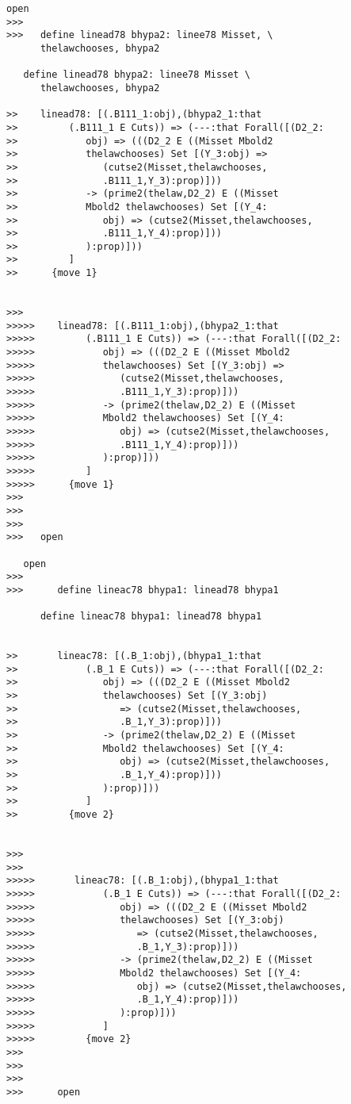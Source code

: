 \documentclass[12pt]{article}
\begin{document}
\begin{verbatim}
open
>>>
>>>   define linead78 bhypa2: linee78 Misset, \
      thelawchooses, bhypa2

   define linead78 bhypa2: linee78 Misset \
      thelawchooses, bhypa2

>>    linead78: [(.B111_1:obj),(bhypa2_1:that
>>         (.B111_1 E Cuts)) => (---:that Forall([(D2_2:
>>            obj) => (((D2_2 E ((Misset Mbold2
>>            thelawchooses) Set [(Y_3:obj) =>
>>               (cutse2(Misset,thelawchooses,
>>               .B111_1,Y_3):prop)]))
>>            -> (prime2(thelaw,D2_2) E ((Misset
>>            Mbold2 thelawchooses) Set [(Y_4:
>>               obj) => (cutse2(Misset,thelawchooses,
>>               .B111_1,Y_4):prop)]))
>>            ):prop)]))
>>         ]
>>      {move 1}


>>>
>>>>>    linead78: [(.B111_1:obj),(bhypa2_1:that
>>>>>         (.B111_1 E Cuts)) => (---:that Forall([(D2_2:
>>>>>            obj) => (((D2_2 E ((Misset Mbold2
>>>>>            thelawchooses) Set [(Y_3:obj) =>
>>>>>               (cutse2(Misset,thelawchooses,
>>>>>               .B111_1,Y_3):prop)]))
>>>>>            -> (prime2(thelaw,D2_2) E ((Misset
>>>>>            Mbold2 thelawchooses) Set [(Y_4:
>>>>>               obj) => (cutse2(Misset,thelawchooses,
>>>>>               .B111_1,Y_4):prop)]))
>>>>>            ):prop)]))
>>>>>         ]
>>>>>      {move 1}
>>>
>>>
>>>
>>>   open

   open
>>>
>>>      define lineac78 bhypa1: linead78 bhypa1

      define lineac78 bhypa1: linead78 bhypa1


>>       lineac78: [(.B_1:obj),(bhypa1_1:that
>>            (.B_1 E Cuts)) => (---:that Forall([(D2_2:
>>               obj) => (((D2_2 E ((Misset Mbold2
>>               thelawchooses) Set [(Y_3:obj)
>>                  => (cutse2(Misset,thelawchooses,
>>                  .B_1,Y_3):prop)]))
>>               -> (prime2(thelaw,D2_2) E ((Misset
>>               Mbold2 thelawchooses) Set [(Y_4:
>>                  obj) => (cutse2(Misset,thelawchooses,
>>                  .B_1,Y_4):prop)]))
>>               ):prop)]))
>>            ]
>>         {move 2}


>>>
>>>
>>>>>       lineac78: [(.B_1:obj),(bhypa1_1:that
>>>>>            (.B_1 E Cuts)) => (---:that Forall([(D2_2:
>>>>>               obj) => (((D2_2 E ((Misset Mbold2
>>>>>               thelawchooses) Set [(Y_3:obj)
>>>>>                  => (cutse2(Misset,thelawchooses,
>>>>>                  .B_1,Y_3):prop)]))
>>>>>               -> (prime2(thelaw,D2_2) E ((Misset
>>>>>               Mbold2 thelawchooses) Set [(Y_4:
>>>>>                  obj) => (cutse2(Misset,thelawchooses,
>>>>>                  .B_1,Y_4):prop)]))
>>>>>               ):prop)]))
>>>>>            ]
>>>>>         {move 2}
>>>
>>>
>>>
>>>      open


\end{verbatim}
\end{document}
